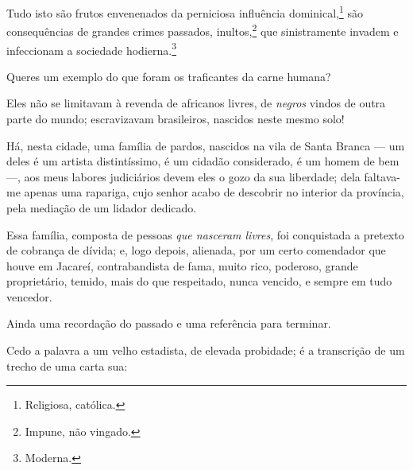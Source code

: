 Tudo isto são frutos envenenados da perniciosa influência
dominical,\footnote{Religiosa, católica.} são consequências de grandes
crimes passados, inultos,\footnote{Impune, não vingado.} que
sinistramente invadem e infeccionam a sociedade hodierna.\footnote{
  Moderna.}

Queres um exemplo do que foram os traficantes da carne humana?

Eles não se limitavam à revenda de africanos livres, de \emph{negros}
vindos de outra parte do mundo; escravizavam brasileiros, nascidos neste
mesmo solo!

Há, nesta cidade, uma família de pardos, nascidos na vila de Santa
Branca --- um deles é um artista distintíssimo, é um cidadão
considerado, é um homem de bem ---, aos meus labores judiciários devem
eles o gozo da sua liberdade; dela faltava-me apenas uma rapariga, cujo
senhor acabo de descobrir no interior da província, pela mediação de um
lidador dedicado.

Essa família, composta de pessoas \textit{que nasceram livres}, foi conquistada a
pretexto de cobrança de dívida; e, logo depois, alienada, por um certo
comendador que houve em Jacareí, contrabandista de fama, muito rico,
poderoso, grande proprietário, temido, mais do que respeitado, nunca
vencido, e sempre em tudo vencedor.

Ainda uma recordação do passado e uma referência para terminar.

Cedo a palavra a um velho estadista, de elevada probidade; é a
transcrição de um trecho de uma carta sua:

